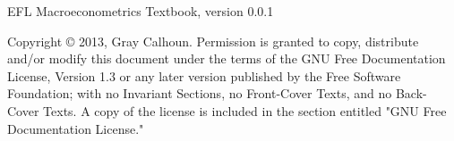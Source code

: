 \documentclass{tufte-book}
\begin{document}
EFL Macroeconometrics Textbook, version 0.0.1

\tableofcontents

\noindent Copyright © 2013, Gray Calhoun.  Permission is granted to
copy, distribute and/or modify this document under the terms of the
GNU Free Documentation License, Version 1.3 or any later version
published by the Free Software Foundation; with no Invariant Sections,
no Front-Cover Texts, and no Back-Cover Texts.  A copy of the license
is included in the section entitled "GNU Free Documentation License."






\appendix

\end{document}
